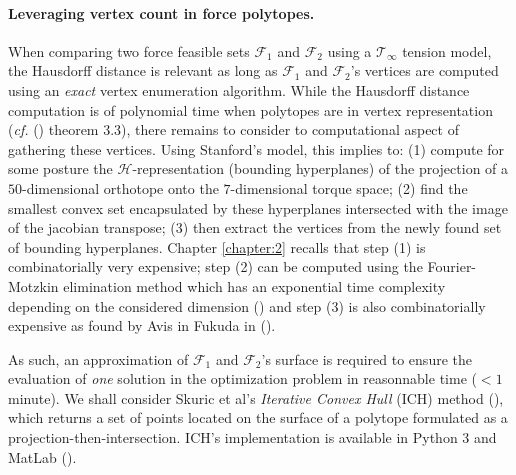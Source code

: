 \paragraph*{Leveraging vertex count in force polytopes.} When comparing two force feasible sets $\mathcal{F}_1$ and $\mathcal{F}_2$ using a $\mathcal{T}_{\infty}$ tension model, the Hausdorff distance is relevant as long as $\mathcal{F}_1$ and $\mathcal{F}_2$'s vertices are computed using an \emph{exact} vertex enumeration algorithm. While the Hausdorff distance computation is of polynomial time when polytopes are in vertex representation (\emph{cf.} (\cite{konigComputationalAspectsHausdorff2014}) theorem 3.3), there remains to consider to computational aspect of gathering these vertices. Using Stanford's model, this implies to: (1) compute for some posture the $\mathcal{H}$-representation (bounding hyperplanes) of the projection of a $50$-dimensional orthotope onto the $7$-dimensional torque space; (2) find the smallest convex set encapsulated by these hyperplanes intersected with the image of the jacobian transpose; (3) then extract the vertices from the newly found set of bounding hyperplanes. Chapter \ref{chapter:2} recalls that step (1) is combinatorially very expensive; step (2) can be computed using the Fourier-Motzkin elimination method which has an exponential time complexity depending on the considered dimension (\cite{dahlCombinatorialPropertiesFourierMotzkin2007}) and step (3) is also combinatorially expensive as found by Avis in Fukuda in (\cite{avisPivotingAlgorithmConvex}). 

As such, an approximation of $\mathcal{F}_1$ and $\mathcal{F}_2$'s surface is required to ensure the evaluation of \emph{one} solution in the optimization problem in reasonnable time ($<1$ minute). We shall consider Skuric et al's \emph{Iterative Convex Hull} (ICH) method (\cite{skuricOnLineFeasibleWrench2022}), which returns a set of points located on the surface of a polytope formulated as a projection-then-intersection. ICH's implementation is available in Python 3 and MatLab (\cite{skuricPycapacityRealtimeTaskspace2023}).

